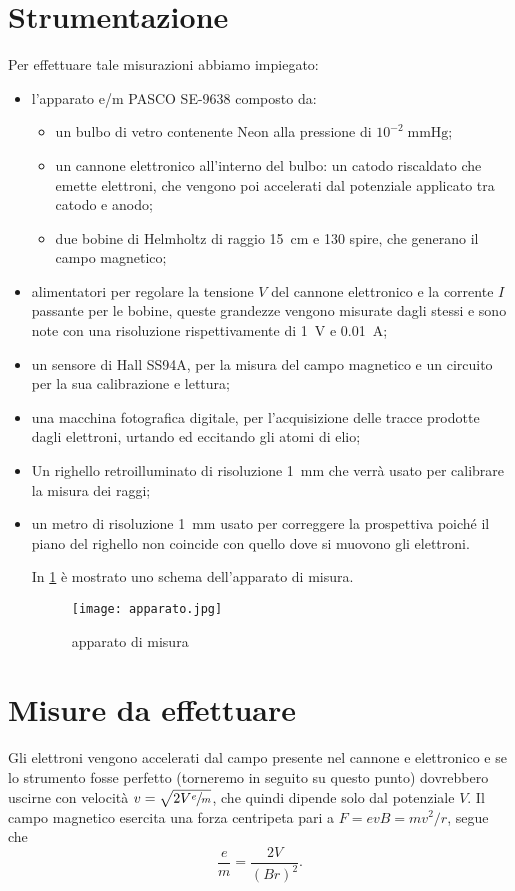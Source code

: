 \section{Strumentazione}
	Per effettuare tale misurazioni abbiamo impiegato:

	\begin{itemize}
		\item l'apparato e/m PASCO SE-9638 composto da:
		\begin{itemize}
			\item un bulbo di vetro contenente Neon alla pressione di $10^{-2} \; \si{\mmHg}$;
			\item un cannone elettronico all'interno del bulbo: un catodo riscaldato che emette elettroni, che vengono poi accelerati dal potenziale applicato tra catodo e anodo;
			\item due bobine di Helmholtz di raggio \SI{15}{cm} e 130 spire, che generano il campo magnetico;
		\end{itemize}
		\item alimentatori per regolare la tensione $V$ del cannone elettronico e la corrente $I$ passante per le bobine, queste grandezze vengono misurate dagli stessi e sono note con una risoluzione rispettivamente di \SI{1}{V} e $ $\SI{0.01}{\ampere};
		\item un sensore di Hall SS94A, per la misura del campo magnetico e un circuito per la sua calibrazione e lettura;
		\item una macchina fotografica digitale, per l'acquisizione delle tracce prodotte dagli elettroni, urtando ed eccitando gli atomi di elio;
		\item Un righello retroilluminato di risoluzione \SI{1}{\mm} che verrà usato per calibrare la misura dei raggi;
		\item un metro di risoluzione \SI{1}{\mm} usato per correggere la prospettiva poiché il piano del righello non coincide con quello dove si muovono gli elettroni.

In \figurename{ \ref{apparato}} è mostrato uno schema dell'apparato di misura.

	\begin{figure}[H]
		\centering
		\texttt{[image: apparato.jpg]}
		\caption{apparato di misura}
		\label{apparato}
	\end{figure}
	
	\end{itemize}
	
\section{Misure da effettuare}
Gli elettroni vengono accelerati dal campo presente nel cannone e elettronico e se lo strumento fosse perfetto (torneremo in seguito su questo punto) dovrebbero uscirne con velocità $v = \sqrt{2V \sfrac{e}{m} }$, che quindi dipende solo dal potenziale $V$.
Il campo magnetico esercita una forza centripeta pari a $F = evB = mv^2/r$, segue che $$\frac{e}{m}=\frac{2V}{(B r)^2}.$$

